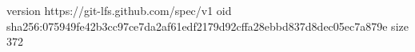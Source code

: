 version https://git-lfs.github.com/spec/v1
oid sha256:075949fe42b3cc97ce7da2af61edf2179d92cffa28ebbd837d8dec05ec7a879e
size 372
